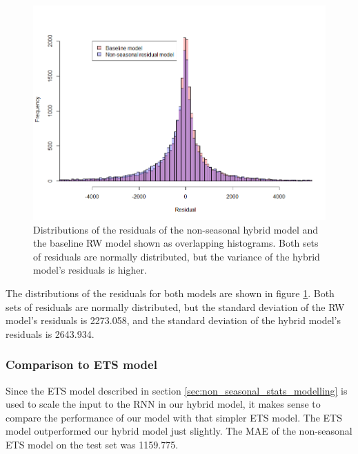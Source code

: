 \documentclass[a4paper,12pt]{article}
\theoremstyle{definition}
\begin{document}
\begin{figure}[ht]
	\centering
	\includegraphics[width=\textwidth]{figures/non_seasonal_res_vs_baseline.png}
	\caption{Distributions of the residuals of the non-seasonal hybrid model and the baseline RW model shown as overlapping histograms. Both sets of residuals are normally distributed, but the variance of the hybrid model's residuals is higher.}
	\label{fig:non_seasonal_res_vs_baseline}
\end{figure}

The distributions of the residuals for both models are shown in figure \ref{fig:non_seasonal_res_vs_baseline}. Both sets of residuals are normally distributed, but the standard deviation of the RW model's residuals is 2273.058, and the standard deviation of the hybrid model's residuals is 2643.934.

\subsubsection{Comparison to ETS model}
Since the ETS model described in section \ref{sec:non_seasonal_stats_modelling} is used to scale the input to the RNN in our hybrid model, it makes sense to compare the performance of our model with that simpler ETS model. The ETS model outperformed our hybrid model just slightly. The MAE of the non-seasonal ETS model on the test set was 1159.775.
\end{document}

